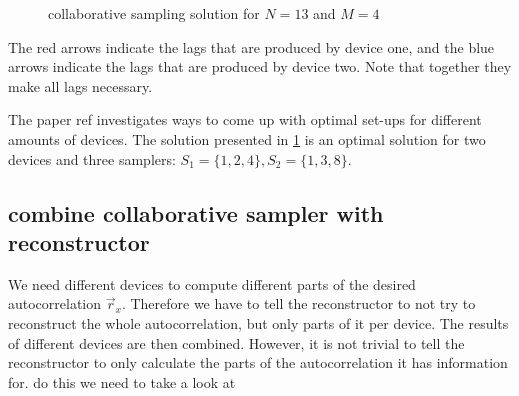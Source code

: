 \documentclass[a4paper, openany, oneside]{memoir}
\begin{document}
\begin{figure}[H]
\caption{collaborative sampling solution for $N=13$ and $M=4$}\label{tkz:collaborative_ruler}
\end{figure}

The red arrows indicate the lags that are produced by device one, and the blue arrows indicate the lags that are produced by device two. Note that together they make all lags necessary.

The paper ref  investigates ways to come up with optimal set-ups for different amounts of devices. The solution presented in \cref{tkz:collaborative_ruler} is an optimal solution for two devices and three samplers: $S_1=\{1,2,4\}, S_2 = \{1,3,8\}$.

\subsection{combine collaborative sampler with reconstructor}\label{sub:ci-collab}
We need different devices to compute different parts of the desired autocorrelation $\vec{r}_x$. Therefore we have to tell the reconstructor to not try to reconstruct the whole autocorrelation, but only parts of it per device. The results of different devices are then combined. However, it is not trivial to tell the reconstructor to only calculate the parts of the autocorrelation it has information for. do this we need to take a look at
\end{document}
